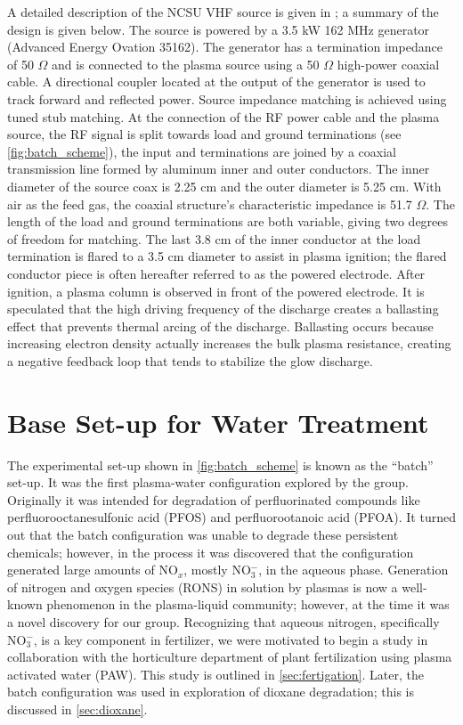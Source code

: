 A detailed description of the NCSU VHF source is given in \cite{byrns2012vhf}; a summary of the design is given below. The source is powered by a 3.5 kW 162 MHz generator (Advanced Energy Ovation 35162). The generator has a termination impedance of 50 $\Omega$ and is connected to the plasma source using a 50 $\Omega$ high-power coaxial cable. A directional coupler located at the output of the generator is used to track forward and reflected power. Source impedance matching is achieved using tuned stub matching. At the connection of the RF power cable and the plasma source, the RF signal is split towards load and ground terminations (see \cref{fig:batch_scheme}), the input and terminations are joined by a coaxial transmission line formed by aluminum inner and outer conductors. The inner diameter of the source coax is 2.25 cm and the outer diameter is 5.25 cm. With air as the feed gas, the coaxial structure's characteristic impedance is 51.7 $\Omega$. The length of the load and ground terminations are both variable, giving two degrees of freedom for matching. The last 3.8 cm of the inner conductor at the load termination is flared to a 3.5 cm diameter to assist in plasma ignition; the flared conductor piece is often hereafter referred to as the powered electrode. After ignition, a plasma column is observed in front of the powered electrode. It is speculated that the high driving frequency of the discharge creates a ballasting effect that prevents thermal arcing of the discharge. Ballasting occurs because increasing electron density actually increases the bulk plasma resistance, creating a negative feedback loop that tends to stabilize the glow discharge. \cite{byrns2012vhf}

\section{Base Set-up for Water Treatment}
\label{sec:base}

The experimental set-up shown in \cref{fig:batch_scheme} is known as the ``batch'' set-up. It was the first plasma-water configuration explored by the group. Originally it was intended for degradation of perfluorinated compounds like perfluorooctanesulfonic acid (PFOS) and perfluorootanoic acid (PFOA). It turned out that the batch configuration was unable to degrade these persistent chemicals; however, in the process it was discovered that the configuration generated large amounts of NO$_x$, mostly NO$_3^-$, in the aqueous phase. Generation of nitrogen and oxygen species (RONS) in solution by plasmas is now a well-known phenomenon in the plasma-liquid community; however, at the time it was a novel discovery for our group. Recognizing that aqueous nitrogen, specifically NO$_3^-$, is a key component in fertilizer, we were motivated to begin a study in collaboration with the horticulture department of plant fertilization using plasma activated water (PAW). This study is outlined in \cref{sec:fertigation}. Later, the batch configuration was used in exploration of dioxane degradation; this is discussed in \cref{sec:dioxane}.

